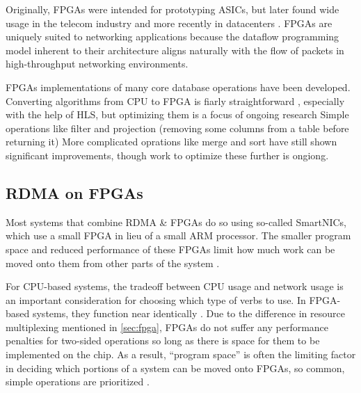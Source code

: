 
Originally, FPGAs were intended for prototyping ASICs, but later found wide usage in the telecom industry \autocite{bobda-trets-2022,mencer-queue-2020} and more recently in datacenters \autocite{mencer-queue-2020,hoozemans-cas-2021}. FPGAs are uniquely suited to networking applications because the dataflow programming model \autocite{hoozemans-cas-2021} inherent to their architecture aligns naturally with the flow of packets in high-throughput networking environments.

FPGAs implementations of many core database operations have been developed. Converting algorithms from CPU to FPGA is fiarly straightforward \autocite{fang-vldb-2020}, especially with the help of HLS, but optimizing them is a focus of ongoing research \autocite{fang-vldb-2020}
Simple operations like filter and projection (removing some columns from a table before returning it) \autocite{fang-vldb-2020}
More complicated oprations like merge \autocite{leggett-trets-2025,moghaddamfar-damon-2021} and sort \autocite{moghaddamfar-damon-2021} have still shown significant improvements, though work to optimize these further is ongiong.


\subsection{RDMA on FPGAs}
\label{sec:rdma-fpga}

Most systems that combine RDMA \& FPGAs do so using so-called SmartNICs, which use a small FPGA in lieu of a small ARM processor. The smaller program space and reduced performance of these FPGAs limit how much work can be moved onto them from other parts of the system \autocite{honeycomb}.

For CPU-based systems, the tradeoff between CPU usage and network usage is an important consideration for choosing which type of verbs to use. In FPGA-based systems, they function near identically \autocite{strom}. Due to the difference in resource multiplexing mentioned in \autoref{sec:fpga}, FPGAs do not suffer any performance penalties for two-sided operations so long as there is space for them to be implemented on the chip. As a result, ``program space'' is often the limiting factor in deciding which portions of a system can be moved onto FPGAs, so common, simple operations are prioritized \autocite{honeycomb,moghaddamfar-damon-2021}.
